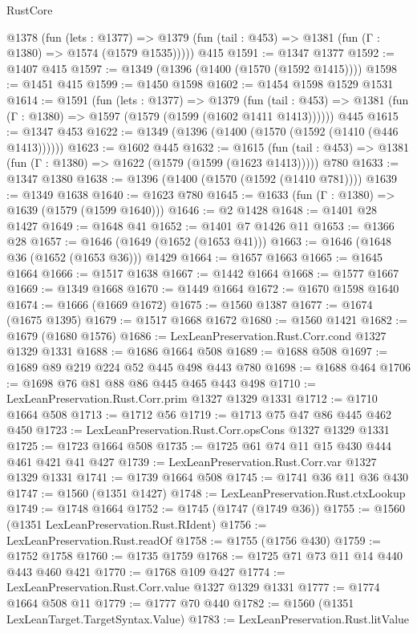 \begin{lexlean}{RustCore}
\begin{coremodule}
    @1378
      (fun (lets : @1377) =>
      @1379 (fun (tail : @453) => @1381 (fun (Γ : @1380) => @1574 (@1579 @1535)))))
    @415
@1591 := @1347 @1377
@1592 := @1407 @415
@1597 := @1349 (@1396 (@1400 (@1570 (@1592 @1415))))
@1598 := @1451 @415
@1599 := @1450 @1598
@1602 := @1454 @1598 @1529 @1531
@1614 := @1591
    (fun (lets : @1377) =>
    @1379
      (fun (tail : @453) => @1381 (fun (Γ : @1380) => @1597 (@1579 (@1599 (@1602 @1411 @1413))))))
    @445
@1615 := @1347 @453
@1622 := @1349 (@1396 (@1400 (@1570 (@1592 (@1410 (@446 @1413))))))
@1623 := @1602 @445
@1632 := @1615
    (fun (tail : @453) => @1381 (fun (Γ : @1380) => @1622 (@1579 (@1599 (@1623 @1413)))))
    @780
@1633 := @1347 @1380
@1638 := @1396 (@1400 (@1570 (@1592 (@1410 @781))))
@1639 := @1349 @1638
@1640 := @1623 @780
@1645 := @1633 (fun (Γ : @1380) => @1639 (@1579 (@1599 @1640)))
@1646 := @2 @1428
@1648 := @1401 @28 @1427
@1649 := @1648 @41
@1652 := @1401 @7 @1426 @11
@1653 := @1366 @28
@1657 := @1646 (@1649 (@1652 (@1653 @41)))
@1663 := @1646 (@1648 @36 (@1652 (@1653 @36))) @1429
@1664 := @1657 @1663
@1665 := @1645 @1664
@1666 := @1517 @1638
@1667 := @1442 @1664
@1668 := @1577 @1667
@1669 := @1349 @1668
@1670 := @1449 @1664
@1672 := @1670 @1598 @1640
@1674 := @1666 (@1669 @1672)
@1675 := @1560 @1387
@1677 := @1674 (@1675 @1395)
@1679 := @1517 @1668 @1672
@1680 := @1560 @1421
@1682 := @1679 (@1680 @1576)
@1686 := LexLeanPreservation.Rust.Corr.cond @1327 @1329 @1331
@1688 := @1686 @1664 @508
@1689 := @1688 @508
@1697 := @1689 @89 @219 @224 @52 @445 @498 @443 @780
@1698 := @1688 @464
@1706 := @1698 @76 @81 @88 @86 @445 @465 @443 @498
@1710 := LexLeanPreservation.Rust.Corr.prim @1327 @1329 @1331
@1712 := @1710 @1664 @508
@1713 := @1712 @56
@1719 := @1713 @75 @47 @86 @445 @462 @450
@1723 := LexLeanPreservation.Rust.Corr.opsCons @1327 @1329 @1331
@1725 := @1723 @1664 @508
@1735 := @1725 @61 @74 @11 @15 @430 @444 @461 @421 @41 @427
@1739 := LexLeanPreservation.Rust.Corr.var @1327 @1329 @1331
@1741 := @1739 @1664 @508
@1745 := @1741 @36 @11 @36 @430
@1747 := @1560 (@1351 @1427)
@1748 := LexLeanPreservation.Rust.ctxLookup
@1749 := @1748 @1664
@1752 := @1745 (@1747 (@1749 @36))
@1755 := @1560 (@1351 LexLeanPreservation.Rust.RIdent)
@1756 := LexLeanPreservation.Rust.readOf
@1758 := @1755 (@1756 @430)
@1759 := @1752 @1758
@1760 := @1735 @1759
@1768 := @1725 @71 @73 @11 @14 @440 @443 @460 @421
@1770 := @1768 @109 @427
@1774 := LexLeanPreservation.Rust.Corr.value @1327 @1329 @1331
@1777 := @1774 @1664 @508 @11
@1779 := @1777 @70 @440
@1782 := @1560 (@1351 LexLeanTarget.TargetSyntax.Value)
@1783 := LexLeanPreservation.Rust.litValue

\end{coremodule}
\end{lexlean}

